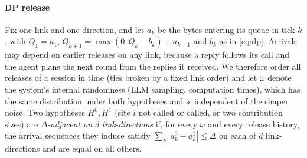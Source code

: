 \paragraph{DP release} Fix one link and one direction, and let $a_k$ be the bytes entering its queue in tick $k$, with $Q_1=a_1$, $Q_{k+1}=\max(0,Q_k-b_k)+a_{k+1}$ and $b_k$ as in \cref{eq:dp}. Arrivals may depend on earlier releases on any link, because a reply follows its call and the agent plans the next round from the replies it received. We therefore order all releases of a session in time (ties broken by a fixed link order) and let $\omega$ denote the system's internal randomness (LLM sampling, computation times), which has the same distribution under both hypotheses and is independent of the shaper noise. Two hypotheses $H^0,H^1$ (site $i$ not called or called, or two contribution sizes) are \emph{$\Delta$-adjacent on $d$ link-directions} if, for every $\omega$ and every release history, the arrival sequences they induce satisfy $\sum_k|a^0_k-a^1_k|\le\Delta$ on each of $d$ link-directions and are equal on all others.

